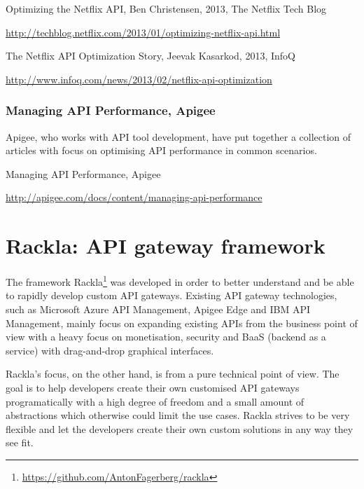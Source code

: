 \documentclass{cslthse-msc}
\begin{document}
\vspace{5mm}

\noindent Optimizing the Netflix API, Ben Christensen, 2013, The Netflix Tech Blog

\noindent \url{http://techblog.netflix.com/2013/01/optimizing-netflix-api.html}

\vspace{5mm}

\noindent The Netflix API Optimization Story, Jeevak Kasarkod, 2013, InfoQ

\noindent \url{http://www.infoq.com/news/2013/02/netflix-api-optimization}


\subsection{Managing API Performance, Apigee}
Apigee, who works with API tool development, have put together a collection of articles with focus on optimising API performance in common scenarios.

\vspace{5mm}

\noindent Managing API Performance, Apigee

\noindent \url{http://apigee.com/docs/content/managing-api-performance}

\chapter{Rackla: API gateway framework}

The framework Rackla\footnote{\url{https://github.com/AntonFagerberg/rackla}} was developed in order to better understand and be able to rapidly develop custom API gateways. Existing API gateway technologies, such as Microsoft Azure API Management\cite{azure_api_management}, Apigee Edge\cite{apigee_edge} and IBM API Management\cite{ibm_api_management}, mainly focus on expanding existing APIs from the business point of view with a heavy focus on monetisation, security and BaaS (backend as a service) with drag-and-drop graphical interfaces. 

Rackla's focus, on the other hand, is from a pure technical point of view. The goal is to help developers create their own customised API gateways programatically with a high degree of freedom and a small amount of abstractions which otherwise could limit the use cases. Rackla strives to be very flexible and let the developers create their own custom solutions in any way they see fit.
\end{document}
